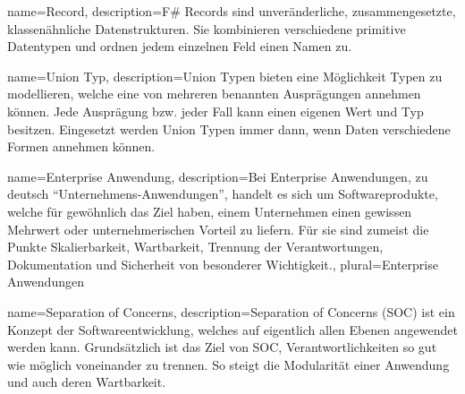 

  {
    name=Record,
    description={F\# Records sind unveränderliche, zusammengesetzte, klassenähnliche Datenstrukturen. Sie kombinieren verschiedene primitive Datentypen und ordnen jedem einzelnen Feld einen Namen zu. }
  }

  {
    name={Union Typ},
    description={Union Typen bieten eine Möglichkeit Typen zu modellieren, welche eine von mehreren benannten Ausprägungen annehmen können. Jede Ausprägung bzw. jeder Fall kann einen eigenen Wert und Typ besitzen. Eingesetzt werden Union Typen immer dann, wenn Daten verschiedene Formen annehmen können.}
  }

{
  name={Enterprise Anwendung},
  description={Bei Enterprise Anwendungen, zu deutsch ``Unternehmens-Anwendungen'', handelt es sich um Softwareprodukte, welche für gewöhnlich das Ziel haben, einem Unternehmen einen gewissen Mehrwert oder unternehmerischen Vorteil zu liefern. Für sie sind zumeist die Punkte Skalierbarkeit, Wartbarkeit, Trennung der Verantwortungen, Dokumentation und Sicherheit von besonderer Wichtigkeit.},
  plural={Enterprise Anwendungen}
}

{
  name={Separation of Concerns},
  description={Separation of Concerns (SOC) ist ein Konzept der Softwareentwicklung, welches auf eigentlich allen Ebenen angewendet werden kann. Grundsätzlich ist das Ziel von SOC, Verantwortlichkeiten so gut wie möglich voneinander zu trennen. So steigt die Modularität einer Anwendung und auch deren Wartbarkeit.}
}

